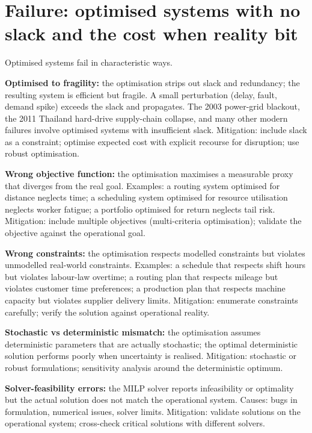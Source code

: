 \section{Failure: optimised systems with no slack and the cost when reality bit}

Optimised systems fail in characteristic ways.

\textbf{Optimised to fragility:} the optimisation strips out slack and redundancy; the resulting system is efficient but fragile. A small perturbation (delay, fault, demand spike) exceeds the slack and propagates. The 2003 power-grid blackout, the 2011 Thailand hard-drive supply-chain collapse, and many other modern failures involve optimised systems with insufficient slack. Mitigation: include slack as a constraint; optimise expected cost with explicit recourse for disruption; use robust optimisation.

\textbf{Wrong objective function:} the optimisation maximises a measurable proxy that diverges from the real goal. Examples: a routing system optimised for distance neglects time; a scheduling system optimised for resource utilisation neglects worker fatigue; a portfolio optimised for return neglects tail risk. Mitigation: include multiple objectives (multi-criteria optimisation); validate the objective against the operational goal.

\textbf{Wrong constraints:} the optimisation respects modelled constraints but violates unmodelled real-world constraints. Examples: a schedule that respects shift hours but violates labour-law overtime; a routing plan that respects mileage but violates customer time preferences; a production plan that respects machine capacity but violates supplier delivery limits. Mitigation: enumerate constraints carefully; verify the solution against operational reality.

\textbf{Stochastic vs deterministic mismatch:} the optimisation assumes deterministic parameters that are actually stochastic; the optimal deterministic solution performs poorly when uncertainty is realised. Mitigation: stochastic or robust formulations; sensitivity analysis around the deterministic optimum.

\textbf{Solver-feasibility errors:} the MILP solver reports infeasibility or optimality but the actual solution does not match the operational system. Causes: bugs in formulation, numerical issues, solver limits. Mitigation: validate solutions on the operational system; cross-check critical solutions with different solvers.

